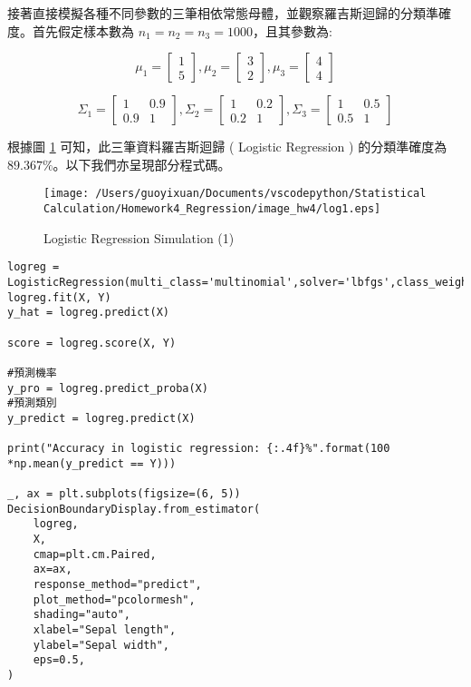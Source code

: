 接著直接模擬各種不同參數的三筆相依常態母體，並觀察羅吉斯迴歸的分類準確度。首先假定樣本數為 $n_1=n_2=n_3=1000$，且其參數為:


$$ \mu_1 = \left[
            \begin{array}{clr}
                1  \\
                5 
            \end{array} \right] ,
            \mu_2 = \left[
            \begin{array}{clr}
                3  \\
                2 
            \end{array} \right] ,
            \mu_3 = \left[
            \begin{array}{clr}
                4  \\
                4 
            \end{array} \right] $$ 
            
$$ \Sigma_1 = \left[
            \begin{array}{clr}
                1 & 0.9  \\
                0.9 & 1
            \end{array} \right] ,
            \Sigma_2 = \left[
            \begin{array}{clr}
                1 & 0.2  \\
                0.2 & 1 
            \end{array} \right] ,
            \Sigma_3 = \left[
            \begin{array}{clr}
                1 & 0.5  \\
                0.5 & 1 
            \end{array} \right] $$       

根據圖 \ref{fig:log1} 可知，此三筆資料羅吉斯迴歸 ( Logistic Regression ) 的分類準確度為 $89.367\%$。以下我們亦呈現部分程式碼。  
            
\begin{figure}[H]
    \centering
        \texttt{[image: /Users/guoyixuan/Documents/vscodepython/Statistical Calculation/Homework4\_Regression/image\_hw4/log1.eps]}
    \caption{Logistic Regression Simulation (1)}
    \label{fig:log1}
\end{figure}

\bigskip
\begin{lstlisting}
logreg = LogisticRegression(multi_class='multinomial',solver='lbfgs',class_weight='balanced',max_iter=1000)
logreg.fit(X, Y)
y_hat = logreg.predict(X) 

score = logreg.score(X, Y)

#預測機率
y_pro = logreg.predict_proba(X) 
#預測類別
y_predict = logreg.predict(X)

print("Accuracy in logistic regression: {:.4f}%".format(100 *np.mean(y_predict == Y)))

_, ax = plt.subplots(figsize=(6, 5))
DecisionBoundaryDisplay.from_estimator(
    logreg,
    X,
    cmap=plt.cm.Paired,
    ax=ax,
    response_method="predict",
    plot_method="pcolormesh",
    shading="auto",
    xlabel="Sepal length",
    ylabel="Sepal width",
    eps=0.5,
)
\end{lstlisting}

